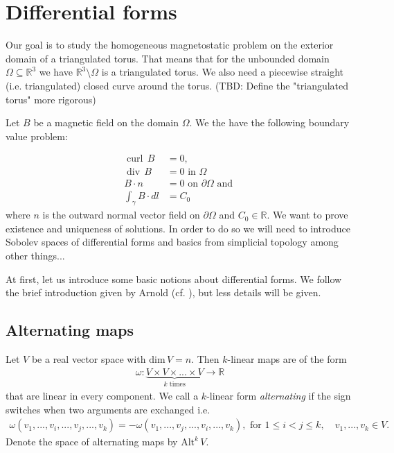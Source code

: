 \documentclass[12pt,a4paper]{article}
\numberwithin{equation}{subsection}
\numberwithin{lemma}{subsection}
\theoremstyle{definition}
\DeclareMathOperator{\curl}{curl}
\DeclareMathOperator{\diver}{div}
\newcommand{\real}{\mathbb{R}}
\begin{document}
\section{Differential forms}

Our goal is to study the homogeneous magnetostatic problem on the exterior 
domain of a triangulated torus. That means 
that for the unbounded domain  $\Omega \subseteq \real^3$ we have
$\real^3 \setminus \Omega$ is a triangulated torus. We also need a 
piecewise straight (i.e. triangulated) closed curve around the torus.
{\color{red} (TBD: Define the "triangulated torus" more rigorous)}

Let $B$ be a magnetic field on the domain $\Omega$.
We the have the following boundary value problem:

\begin{align}
    \curl \, B &= 0, \\ 
    \diver \, B  &= 0 \text{ in } \Omega \\
    B \cdot n &= 0 \text{ on } \partial \Omega \text{ and }\\
    \int_\gamma B \cdot dl &= C_0
\end{align}
where $n$ is the outward normal vector field on $\partial \Omega$ and 
$C_0 \in \real$. We want to prove existence and uniqueness of 
solutions. In order to do so we will need to introduce Sobolev spaces of 
differential forms and basics from
simplicial topology {\color{red} among other things...}

At first, let us introduce some basic notions about differential forms. 
We follow the brief introduction given by Arnold (cf. \cite[Sec. 6.1]{arnold}), 
but less details will be given. 

\subsection{Alternating maps}

Let $V$ be a real vector space with $\text{dim}\,V = n$.
Then $k$-linear maps are of the form
\begin{align*}
    \omega: \underbrace{V \times V \times ... \times V}_{k \text{ times}}
    \rightarrow \real
\end{align*}
that are linear in every component. We call a $k$-linear form 
\textit{alternating} if the sign switches when two arguments are exchanged i.e.
\begin{align*}
    \omega(v_1,...,v_i,...,v_j,...,v_k)
    = - \omega(v_1,...,v_j,...,v_i,...,v_k), \text{ for } 1\leq i < j \leq k,
    \quad v_1,...,v_k \in V.
\end{align*}
Denote the space of alternating maps by $\text{Alt}^k\,V$.
\end{document}
